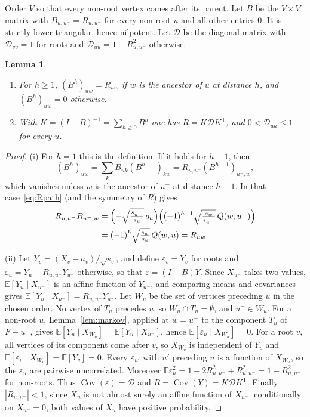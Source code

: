 \documentclass{amsart}
\numberwithin{equation}{section}
\numberwithin{table}{section}
\newtheorem{lemma}[theorem]{Lemma}
\theoremstyle{definition}
\theoremstyle{remark}
\newcommand{\E}{\mathbb{E}}
\newcommand{\Cov}{\operatorname{Cov}}
\newcommand{\eps}{\varepsilon}
\begin{document}
Order $V$ so that every non-root vertex comes after its parent. Let $B$ be the $V\times V$ matrix with $B_{u,u^-}=R_{u,u^-}$ for every non-root $u$ and all other entries $0$. It is strictly lower triangular, hence nilpotent. Let $\mathcal D$ be the diagonal matrix with $\mathcal D_{vv}=1$ for roots and $\mathcal D_{uu}=1-R_{u,u^-}^2$ otherwise.

\begin{lemma}\label{lem:factor}
\begin{enumerate}
\item[(i)] For $h\ge1$, $(B^h)_{uw}=R_{uw}$ if $w$ is the ancestor of $u$ at distance $h$, and $(B^h)_{uw}=0$ otherwise.
\item[(ii)] With $K=(I-B)^{-1}=\sum_{h\ge0}B^h$ one has $R=K\mathcal DK^{\mathsf T}$, and $0<\mathcal D_{uu}\le1$ for every $u$.
\end{enumerate}
\end{lemma}

\begin{proof}
(i) For $h=1$ this is the definition. If it holds for $h-1$, then\[(B^h)_{uw}=\sum_kB_{uk}(B^{h-1})_{kw}=R_{u,u^-}(B^{h-1})_{u^-,w},\]which vanishes unless $w$ is the ancestor of $u^-$ at distance $h-1$. In that case~\eqref{eq:Rpath} (and the symmetry of $R$) gives
\begin{align*}
R_{u,u^-}R_{u^-,w}&=\Bigl(-\sqrt{\tfrac{s_{u^-}}{s_u}}\,q_u\Bigr)\Bigl((-1)^{h-1}\sqrt{\tfrac{s_w}{s_{u^-}}}\,Q(w,u^-)\Bigr)\\
&=(-1)^h\sqrt{\tfrac{s_w}{s_u}}\,Q(w,u)=R_{uw}.
\end{align*}

(ii) Let $Y_v=(X_v-a_v)/\sqrt{s_v}$, and define $\eps_v=Y_v$ for roots and $\eps_u=Y_u-R_{u,u^-}Y_{u^-}$ otherwise, so that $\eps=(I-B)Y$. Since $X_{u^-}$ takes two values, $\E[Y_u\mid X_{u^-}]$ is an affine function of $Y_{u^-}$, and comparing means and covariances gives $\E[Y_u\mid X_{u^-}]=R_{u,u^-}Y_{u^-}$. Let $W_u$ be the set of vertices preceding $u$ in the chosen order. No vertex of $T_u$ precedes $u$, so $W_u\cap T_u=\emptyset$, and $u^-\in W_u$. For a non-root $u$, Lemma~\ref{lem:markov}, applied at $w=u^-$ to the component $T_u$ of $F-u^-$, gives $\E[Y_u\mid X_{W_u}]=\E[Y_u\mid X_{u^-}]$, hence $\E[\eps_u\mid X_{W_u}]=0$. For a root $v$, all vertices of its component come after $v$, so $X_{W_v}$ is independent of $Y_v$ and $\E[\eps_v\mid X_{W_v}]=\E[Y_v]=0$. Every $\eps_{u'}$ with $u'$ preceding $u$ is a function of $X_{W_u}$, so the $\eps_u$ are pairwise uncorrelated. Moreover $\E\eps_u^2=1-2R_{u,u^-}^2+R_{u,u^-}^2=1-R_{u,u^-}^2$ for non-roots. Thus $\Cov(\eps)=\mathcal D$ and $R=\Cov(Y)=K\mathcal DK^{\mathsf T}$. Finally $|R_{u,u^-}|<1$, since $X_u$ is not almost surely an affine function of $X_{u^-}$: conditionally on $X_{u^-}=0$, both values of $X_u$ have positive probability.
\end{proof}
\end{document}
